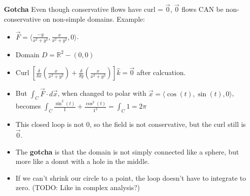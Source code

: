 \documentclass[11pt, oneside]{article}   	%
\begin{document}
\textbf{Gotcha} Even though conservative flows have curl = $\vec{0}$,  $\vec{0}$ flows CAN be non-conservative on non-simple domains.  Example: 
\begin{itemize}
\item $\vec{F} = \langle \frac{-y}{x^2+y^2}, \frac{x}{x^2+y^2}, 0 \rangle $.  
\item Domain $D = \mathbb{R}^2 - (0,0)$
\item Curl $[\frac{\delta}{\delta x}(\frac{x}{x^2+y^2}) + \frac{\delta}{\delta y}(\frac{x}{x^2+y^2})]\hat{k} = \vec{0}$ after calcuation.
\item But $\int_C \vec{F}\cdot d\vec{x}$, when changed to polar with $\vec{x} = \langle \cos(t), \sin(t), 0\rangle$, becomes $\int_C \frac{\sin^2(t)}{1} + \frac{\cos^2(t)}{1^2} = \int_C 1 = 2\pi$
\item This closed loop is not 0, so the field is not conservative, but the curl still is $\vec{0}$.
\item The \textbf{gotcha} is that the domain is not simply connected like a sphere, but more like a donut with a hole in the middle.
\item If we can't shrink our circle to a point, the loop doesn't have to integrate to zero.  (TODO: Like in complex analysis?)
\end{itemize}
\end{document}
